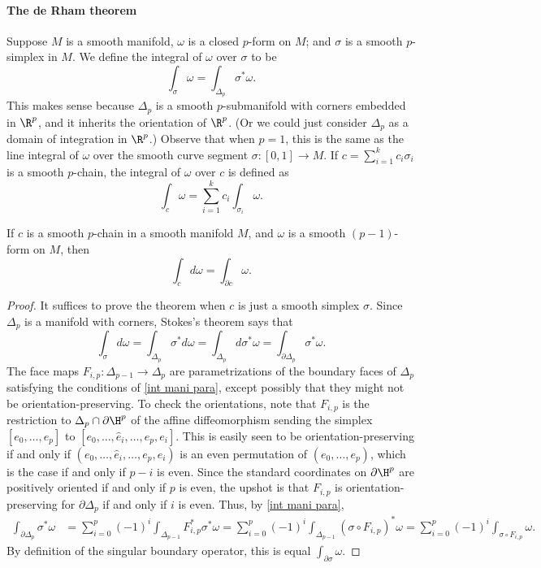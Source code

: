 \paragraph{The de Rham theorem}
Suppose $M$ is a smooth manifold, $\omega$ is a closed $p$-form on $M$; and $\sigma$ is a smooth $p$-simplex in $M$. We define the integral of $\omega$ over $\sigma$ to 
be
\[\int_{\sigma}\omega=\int_{\Delta_p}\sigma^*\omega.\]
This makes sense because $\Delta_p$ is a smooth $p$-submanifold with corners embedded in $\R^p$, and it inherits the orientation of $\R^p$. (Or we could just consider $\Delta_p$ 
as a domain of integration in $\R^p$.) Observe that when $p=1$, this is the same as the line integral of $\omega$ over the smooth curve segment $\sigma:[0,1]\to M$. If 
$c=\sum_{i=1}^{k}c_i\sigma_i$ is a smooth $p$-chain, the integral of $\omega$ over $c$ is defined as
\[\int_{c}\omega=\sum_{i=1}^{k}c_i\int_{\sigma_i}\omega.\]
\begin{theorem}\label{Stokes's theorem for chains}
If $c$ is a smooth $p$-chain in a smooth manifold $M$, and $\omega$ is a smooth $(p-1)$-form on $M$, then
\[\int_cd\omega=\int_{\partial c}\omega.\]
\end{theorem}
\begin{proof}
It suffices to prove the theorem when $c$ is just a smooth simplex $\sigma$. Since $\Delta_p$ is a manifold with corners, Stokes's theorem says that
\[\int_{\sigma}d\omega=\int_{\Delta_p}\sigma^*d\omega=\int_{\Delta_p}d\sigma^*\omega=\int_{\partial\Delta_p}\sigma^*\omega.\]
The face maps $F_{i,p}:\Delta_{p-1}\to\Delta_p$ are parametrizations of the boundary faces of $\Delta_p$ satisfying the conditions of \cref{int mani para}, 
except possibly that they might not be orientation-preserving. To check the orientations, note that $F_{i,p}$ is the restriction to $\Delta_p\cap\partial\H^p$ of the 
affine diffeomorphism sending the simplex $[e_0,\dots,e_p]$ to $[e_0,\dots,\widehat{e}_i,\dots,e_p,e_i]$. This is easily seen to be orientation-preserving if and only 
if $(e_0,\dots,\widehat{e}_i,\dots,e_p,e_i)$ is an even permutation of $(e_0,\dots,e_p)$, which is the case if and only if $p-i$ is even. Since the standard coordinates 
on $\partial\H^p$ are positively oriented if and only if $p$ is even, the upshot is that $F_{i,p}$ is orientation-preserving for $\partial\Delta_p$ if and only if $i$ is 
even. Thus, by \cref{int mani para},
\begin{align*}
\int_{\partial\Delta_p}\sigma^*\omega&=\sum_{i=0}^{p}(-1)^i\int_{\Delta_{p-1}}F_{i,p}^*\sigma^*\omega=\sum_{i=0}^{p}(-1)^i\int_{\Delta_{p-1}}(\sigma\circ F_{i,p})^*\omega=\sum_{i=0}^{p}(-1)^i\int_{\sigma\circ F_{i,p}}\omega.
\end{align*}
By definition of the singular boundary operator, this is equal $\int_{\partial\sigma}\omega$.
\end{proof}
